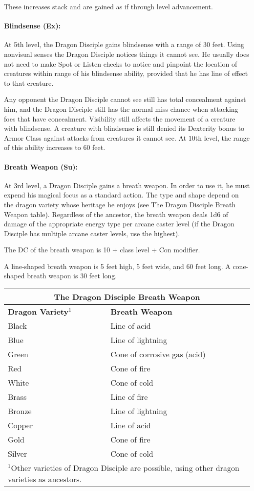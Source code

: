 These increases stack and are gained as if through level advancement.

\paragraph{Blindsense (Ex):}
At 5th level, the Dragon Disciple gains blindsense with a range of 30 feet.
Using nonvisual senses the Dragon Disciple notices things it cannot see. 
He usually does not need to make Spot or Listen checks to notice and pinpoint the location of creatures within range of his blindsense ability, 
provided that he has line of effect to that creature.

Any opponent the Dragon Disciple cannot see still has total concealment against him, and the Dragon Disciple still has the normal miss chance when attacking foes that have concealment. 
Visibility still affects the movement of a creature with blindsense. 
A creature with blindsense is still denied its Dexterity bonus to Armor Class against attacks from creatures it cannot see. 
At 10th level, the range of this ability increases to 60 feet.
\paragraph{Breath Weapon (Su):}
At 3rd level, a Dragon Disciple gains a breath weapon.
In order to use it, he must expend his magical focus as a standard action.
The type and shape depend on the dragon variety whose heritage he enjoys (see The Dragon Disciple Breath Weapon table). 
Regardless of the ancestor, the breath weapon deals 1d6 of damage of the appropriate energy type per arcane caster level (if the Dragon Disciple has multiple arcane caster levels, use the highest).

The DC of the breath weapon is 10 + class level + Con modifier.

A line-shaped breath weapon is 5 feet high, 5 feet wide, and 60 feet long. A cone-shaped breath weapon is 30 feet long.

\begin{center}
\begin{tabular}{|p{3cm}|p{3.4cm}|}
\multicolumn{2}{c}{\textbf{The Dragon Disciple Breath Weapon}}\\
\hline
\textbf{Dragon Variety}$^1$&\textbf{Breath Weapon}\\
\hline
Black		&Line of acid\\
Blue		&Line of lightning\\
Green		&Cone of corrosive gas (acid)\\
Red		&Cone of fire\\
White		&Cone of cold\\
Brass		&Line of fire\\
Bronze		&Line of lightning\\
Copper		&Line of acid\\
Gold		&Cone of fire\\
Silver		&Cone of cold\\
\hline
\multicolumn{2}{p{6.4cm}}{\scriptsize $^1$Other varieties of Dragon Disciple are possible, using other dragon varieties as ancestors.}
\end{tabular}
\end{center}

